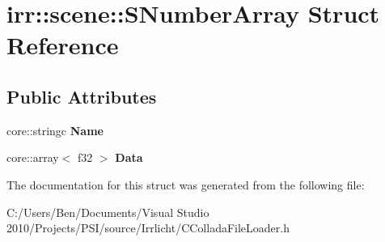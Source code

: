 \hypertarget{structirr_1_1scene_1_1_s_number_array}{\section{irr\-:\-:scene\-:\-:S\-Number\-Array Struct Reference}
\label{structirr_1_1scene_1_1_s_number_array}
}
\subsection*{Public Attributes}
\begin{DoxyCompactItemize}
\item 
\hypertarget{structirr_1_1scene_1_1_s_number_array_abae10895c854114c1f88a5734a27916b}{core\-::stringc {\bfseries Name}}\label{structirr_1_1scene_1_1_s_number_array_abae10895c854114c1f88a5734a27916b}

\item 
\hypertarget{structirr_1_1scene_1_1_s_number_array_a05101031670280ef6a23a6de9ef0821d}{core\-::array$<$ f32 $>$ {\bfseries Data}}\label{structirr_1_1scene_1_1_s_number_array_a05101031670280ef6a23a6de9ef0821d}

\end{DoxyCompactItemize}


The documentation for this struct was generated from the following file\-:\begin{DoxyCompactItemize}
\item 
C\-:/\-Users/\-Ben/\-Documents/\-Visual Studio 2010/\-Projects/\-P\-S\-I/source/\-Irrlicht/C\-Collada\-File\-Loader.\-h\end{DoxyCompactItemize}
